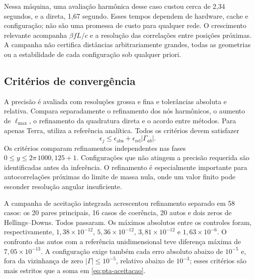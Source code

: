 Nessa máquina, uma avaliação harmônica desse caso custou cerca de
2,34 segundos, e a direta, 1,67 segundo. Esses tempos dependem de
hardware, cache e configuração; não são uma promessa de custo para
qualquer rede. O crescimento relevante acompanha \(\beta fL/c\)
e a resolução das correlações entre posições próximas. A campanha
não certifica distâncias arbitrariamente grandes, todas as geometrias
ou a estabilidade de cada configuração sob qualquer priori.

\subsection{Critérios de convergência}

A precisão é avaliada com resoluções grossa e fina e tolerâncias absoluta e relativa. Compara separadamente o refinamento dos nós harmônicos, o aumento de
\(\ell_{\max}\), o refinamento da quadratura direta e o acordo entre
métodos. Para apenas Terra, utiliza a referência analítica. Todos os
critérios devem satisfazer
\begin{equation}
 \epsilon_j\leq\epsilon_{\mathrm{abs}}
                   +\epsilon_{\mathrm{rel}}\lvert\Gamma_{ab}\rvert.
 \label{eq:pta-aceitacao}
\end{equation}
Os critérios comparam refinamentos independentes nas fases $0\leq y\leq2\pi\,1000{,}125+1$. Configurações que não atingem a precisão requerida são identificadas antes da inferência. O refinamento é especialmente importante para autocorrelações próximas do limite de massa nula, onde um valor finito pode esconder resolução angular insuficiente.

A campanha de aceitação integrada acrescentou refinamento separado em
58 casos: os 20 pares principais, 16 casos de coerência, 20 autos e dois
zeros de Hellings--Downs. Todos passaram. Os máximos absolutos entre os
controles foram, respectivamente,
\(1{,}38\times10^{-12}\), \(5{,}36\times10^{-12}\),
\(3{,}81\times10^{-12}\) e \(1{,}63\times10^{-6}\).
O confronto das autos com a referência unidimensional teve diferença
máxima de \(7{,}05\times10^{-13}\). A configuração exige também
cada erro absoluto abaixo de \(10^{-5}\) e, fora da vizinhança de
zero \(\lvert\Gamma\rvert\leq10^{-5}\), relativo abaixo de
\(10^{-3}\); esses critérios são mais estritos que a soma em
\eqref{eq:pta-aceitacao}.

